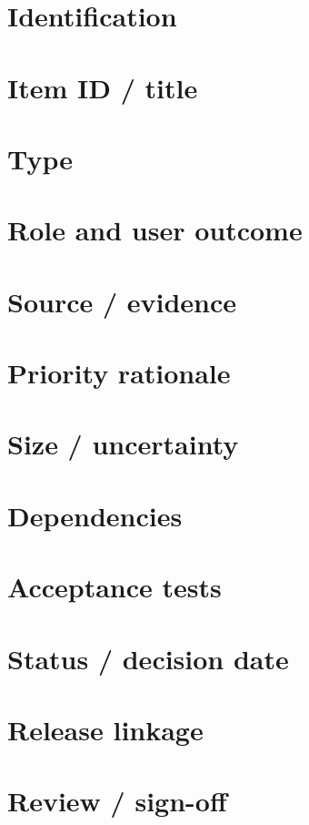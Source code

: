 \documentclass[11pt,letterpaper]{article}
\begin{document}
\section{Identification}
\section{Item ID / title}
\section{Type}
\section{Role and user outcome}
\section{Source / evidence}
\section{Priority rationale}
\clearpage
\section{Size / uncertainty}
\section{Dependencies}
\section{Acceptance tests}
\section{Status / decision date}
\clearpage
\section{Release linkage}
\section{Review / sign-off}
\end{document}
